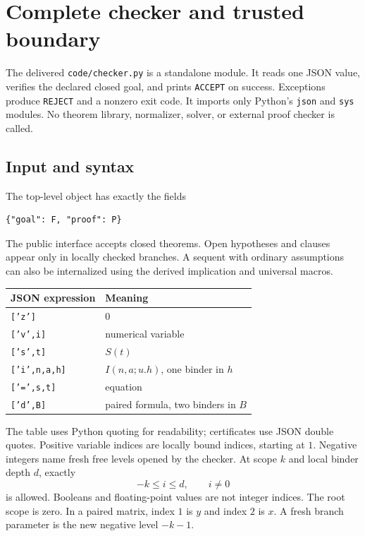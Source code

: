 \documentclass[11pt]{article}
\theoremstyle{definition}\newtheorem{definition}[theorem]{Definition}
\begin{document}
\section{Complete checker and trusted boundary}\label{sec:checker}

The delivered \texttt{code/checker.py} is a standalone module. It
reads one JSON value, verifies the declared closed goal, and prints
\texttt{ACCEPT} on success. Exceptions produce \texttt{REJECT} and
a nonzero exit code. It imports only Python's \texttt{json} and
\texttt{sys} modules. No theorem library, normalizer, solver, or
external proof checker is called.

\subsection{Input and syntax}

The top-level object has exactly the fields
\begin{lstlisting}
{"goal": F, "proof": P}
\end{lstlisting}
The public interface accepts closed theorems. Open hypotheses and
clauses appear only in locally checked branches. A sequent with
ordinary assumptions can also be internalized using the derived
implication and universal macros.

\begin{center}
\begin{tabular}{@{}ll@{}}
\toprule
JSON expression & Meaning\\
\midrule
\texttt{['z']} & $0$\\
\texttt{['v',i]} & numerical variable\\
\texttt{['s',t]} & $S(t)$\\
\texttt{['i',n,a,h]} & $I(n,a;u.h)$, one binder in $h$\\
\texttt{['=',s,t]} & equation\\
\texttt{['d',B]} & paired formula, two binders in $B$\\
\bottomrule
\end{tabular}
\end{center}
The table uses Python quoting for readability; certificates use JSON
double quotes. Positive variable indices are locally bound indices,
starting at $1$. Negative integers name fresh free levels opened by
the checker. At scope $k$ and local binder depth $d$, exactly
\[
                    -k\le i\le d,\qquad i\ne0
\]
is allowed. Booleans and floating-point values are not integer indices.
The root scope is zero. In a paired matrix, index $1$ is $y$ and
index $2$ is $x$. A fresh branch parameter is the new negative level
$-k-1$.
\end{document}
